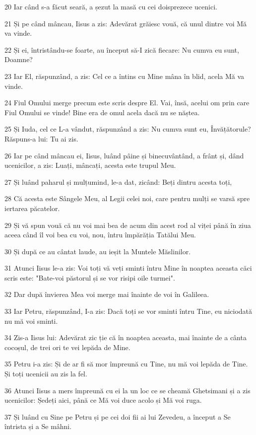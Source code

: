 \par 20 Iar când s-a făcut seară, a șezut la masă cu cei doisprezece ucenici.
\par 21 Și pe când mâncau, Iisus a zis: Adevărat grăiesc vouă, că unul dintre voi Mă va vinde.
\par 22 Și ei, întristându-se foarte, au început să-I zică fiecare: Nu cumva eu sunt, Doamne?
\par 23 Iar El, răspunzând, a zis: Cel ce a întins cu Mine mâna în blid, acela Mă va vinde.
\par 24 Fiul Omului merge precum este scris despre El. Vai, însă, acelui om prin care Fiul Omului se vinde! Bine era de omul acela dacă nu se năștea.
\par 25 Și Iuda, cel ce L-a vândut, răspunzând a zis: Nu cumva sunt eu, Învățătorule? Răspuns-a lui: Tu ai zis.
\par 26 Iar pe când mâncau ei, Iisus, luând pâine și binecuvântând, a frânt și, dând ucenicilor, a zis: Luați, mâncați, acesta este trupul Meu.
\par 27 Și luând paharul și mulțumind, le-a dat, zicând: Beți dintru acesta toți,
\par 28 Că acesta este Sângele Meu, al Legii celei noi, care pentru mulți se varsă spre iertarea păcatelor.
\par 29 Și vă spun vouă că nu voi mai bea de acum din acest rod al viței până în ziua aceea când îl voi bea cu voi, nou, întru împărăția Tatălui Meu.
\par 30 Și după ce au cântat laude, au ieșit la Muntele Măslinilor.
\par 31 Atunci Iisus le-a zis: Voi toți vă veți sminti întru Mine în noaptea aceasta căci scris este: "Bate-voi păstorul și se vor risipi oile turmei".
\par 32 Dar după învierea Mea voi merge mai înainte de voi în Galileea.
\par 33 Iar Petru, răspunzând, I-a zis: Dacă toți se vor sminti întru Tine, eu niciodată nu mă voi sminti.
\par 34 Zis-a Iisus lui: Adevărat zic ție că în noaptea aceasta, mai înainte de a cânta cocoșul, de trei ori te vei lepăda de Mine.
\par 35 Petru i-a zis: Și de ar fi să mor împreună cu Tine, nu mă voi lepăda de Tine. Și toți ucenicii au zis la fel.
\par 36 Atunci Iisus a mers împreună cu ei la un loc ce se cheamă Ghetsimani și a zis ucenicilor: Ședeți aici, până ce Mă voi duce acolo și Mă voi ruga.
\par 37 Și luând cu Sine pe Petru și pe cei doi fii ai lui Zevedeu, a început a Se întrista și a Se mâhni.
